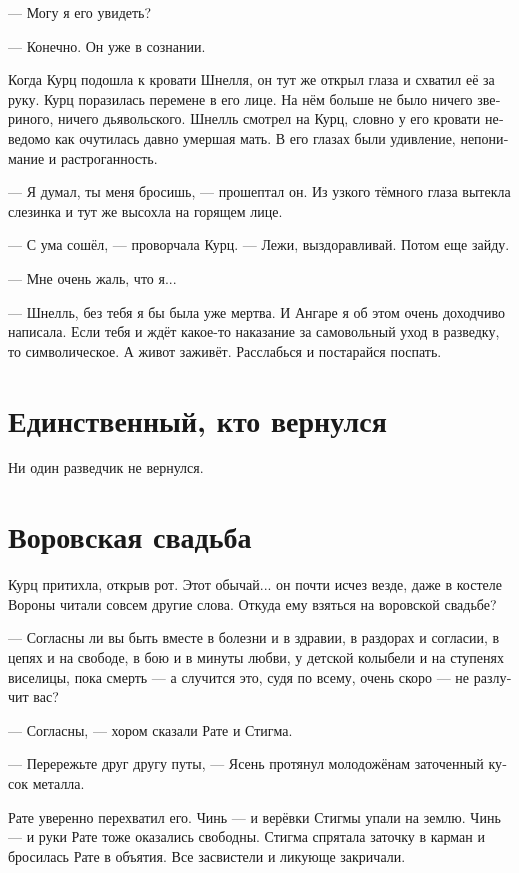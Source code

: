 \documentclass[a4paper,12pt,fleqn]{book}\usepackage{polyglossia}\setdefaultlanguage[babelshorthands=true]{russian}\setotherlanguage{english}\defaultfontfeatures{Ligatures=TeX,Mapping=tex-text}\usepackage{xcolor}\newcommand{\ml}[3]{#2}
\begin{document}
--- Могу я его увидеть?

--- Конечно.
Он уже в сознании.

Когда Курц подошла к кровати Шнелля, он тут же открыл глаза и схватил её за руку.
Курц поразилась перемене в его лице.
На нём больше не было ничего звериного, ничего дьявольского.
Шнелль смотрел на Курц, словно у его кровати неведомо как очутилась давно умершая мать.
В его глазах были удивление, непонимание и растроганность.

--- Я думал, ты меня бросишь, --- прошептал он.
Из узкого тёмного глаза вытекла слезинка и тут же высохла на горящем лице.

--- С ума сошёл, --- проворчала Курц.
--- Лежи, выздоравливай.
Потом еще зайду.

--- Мне очень жаль, что я...

--- Шнелль, без тебя я бы была уже мертва.
И Ангаре я об этом очень доходчиво написала.
Если тебя и ждёт какое-то наказание за самовольный уход в разведку, то символическое.
А живот заживёт.
Расслабься и постарайся поспать.

\section{Единственный, кто вернулся}

Ни один разведчик не вернулся.

\section{Воровская свадьба}

Курц притихла, открыв рот.
Этот обычай... он почти исчез везде, даже в костеле Вороны читали совсем другие слова.
Откуда ему взяться на воровской свадьбе?

--- Согласны ли вы быть вместе в болезни и в здравии, в раздорах и согласии, в цепях и на свободе, в бою и в минуты любви, у детской колыбели и на ступенях виселицы, пока смерть --- а случится это, судя по всему, очень скоро --- не разлучит вас?

--- Согласны, --- хором сказали Рате и Стигма.

--- Перережьте друг другу путы, --- Ясень протянул молодожёнам заточенный кусок металла.

Рате уверенно перехватил его.
Чинь --- и верёвки Стигмы упали на землю.
Чинь --- и руки Рате тоже оказались свободны.
Стигма спрятала заточку в карман и бросилась Рате в объятия.
Все засвистели и ликующе закричали.
\end{document}
